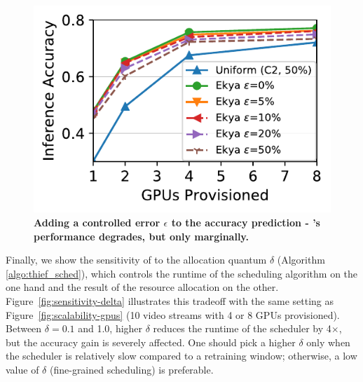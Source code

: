 \begin{figure}
	\includegraphics[width=\linewidth]{results/sensitivity/sensitivity_profileerrors_cityscapes.pdf}
	\caption{\small \bf Adding a controlled error $\epsilon$ to the accuracy prediction -  \name{}'s performance degrades, but only marginally.}
	\label{fig:sensitivity-accuracy-error}
\end{figure}


 
Finally, we show the sensitivity of \name to the allocation quantum $\delta$ (Algorithm \ref{algo:thief_sched}), which controls the runtime of the scheduling algorithm on the one hand and the result of the resource allocation on the other.
Figure~\ref{fig:sensitivity-delta} illustrates this tradeoff with the same setting as Figure~\ref{fig:scalability-gpus} (10 video streams with 4 or 8 GPUs provisioned).
Between $\delta=0.1$ and 1.0, higher $\delta$ reduces the runtime of the scheduler by 4$\times$, but the accuracy gain is severely affected. 
One should pick a higher $\delta$ only when the scheduler is relatively slow compared to a retraining window; otherwise, a low value of $\delta$ (fine-grained scheduling) is preferable.


